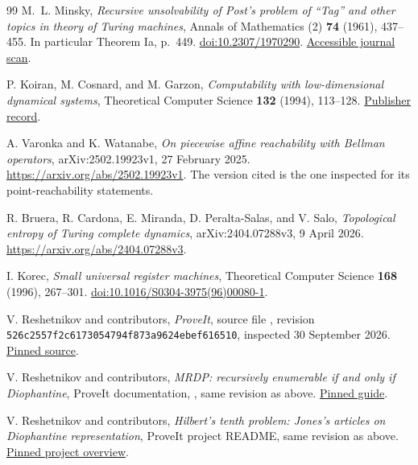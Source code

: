 \documentclass[11pt,letterpaper]{article}
\numberwithin{equation}{section}
\theoremstyle{definition}
\theoremstyle{remark}
\newcommand{\code}[1]{\nolinkurl{#1}}
\begin{document}
\begin{thebibliography}{99}
M.~L. Minsky, \emph{Recursive unsolvability of Post's problem of ``Tag'' and
other topics in theory of Turing machines}, Annals of Mathematics (2)
\textbf{74} (1961), 437--455. In particular Theorem Ia, p.~449.
\href{https://doi.org/10.2307/1970290}{doi:10.2307/1970290}.
\href{https://www.wolframscience.com/prizes/tm23/images/Minsky.pdf}{Accessible journal scan}.

P. Koiran, M. Cosnard, and M. Garzon,
\emph{Computability with low-dimensional dynamical systems},
Theoretical Computer Science \textbf{132} (1994), 113--128.
\href{https://www.sciencedirect.com/science/article/pii/0304397594902291}{Publisher record}.

A. Varonka and K. Watanabe,
\emph{On piecewise affine reachability with Bellman operators},
arXiv:2502.19923v1, 27 February 2025.
\url{https://arxiv.org/abs/2502.19923v1}.
The version cited is the one inspected for its point-reachability statements.

R. Bruera, R. Cardona, E. Miranda, D. Peralta-Salas, and V. Salo,
\emph{Topological entropy of Turing complete dynamics},
arXiv:2404.07288v3, 9 April 2026.
\url{https://arxiv.org/abs/2404.07288v3}.

I. Korec, \emph{Small universal register machines},
Theoretical Computer Science \textbf{168} (1996), 267--301.
\href{https://doi.org/10.1016/S0304-3975(96)00080-1}{doi:10.1016/S0304-3975(96)00080-1}.

V. Reshetnikov and contributors, \emph{ProveIt}, source file
,
revision \code{526c2557f2c6173054794f873a9624ebef616510},
inspected 30 September 2026.
\href{https://github.com/VladimirReshetnikov/ProveIt/blob/526c2557f2c6173054794f873a9624ebef616510/Computability/HilbertTenthProblem/Lean/Diophantine/MRDP.lean}{Pinned source}.

V. Reshetnikov and contributors, \emph{MRDP: recursively enumerable if and
only if Diophantine}, ProveIt documentation,
, same revision as above.
\href{https://github.com/VladimirReshetnikov/ProveIt/blob/526c2557f2c6173054794f873a9624ebef616510/Computability/HilbertTenthProblem/Lean/MRDP.md}{Pinned guide}.

V. Reshetnikov and contributors, \emph{Hilbert's tenth problem: Jones's
articles on Diophantine representation}, ProveIt project README,
same revision as above.
\href{https://github.com/VladimirReshetnikov/ProveIt/blob/526c2557f2c6173054794f873a9624ebef616510/Computability/HilbertTenthProblem/README.md}{Pinned project overview}.


\end{thebibliography}
\end{document}
